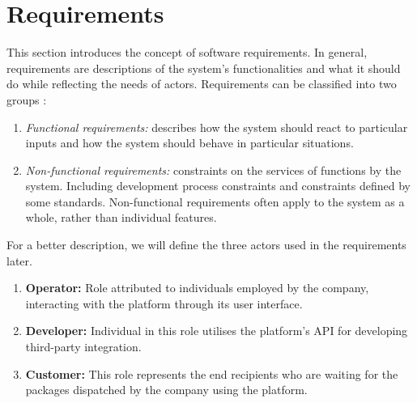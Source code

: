 \section{Requirements}
\label{sec:requirements}
This section introduces the concept of software requirements.
In general, requirements are descriptions of the system's functionalities and what it should do while reflecting the needs of actors.
Requirements can be classified into two groups \cite{sommervilleSW}:
\begin{enumerate}
    \item \textit{Functional requirements:} describes how the system should react to particular inputs and how the system should behave in particular situations.
    \item \textit{Non-functional requirements:} constraints on the services of functions by the system. Including development process constraints and constraints defined by some standards. Non-functional requirements often apply to the system as a whole, rather than individual features.
\end{enumerate}
For a better description, we will define the three actors used in the requirements later.
\label{sec:requirements-actors}
\begin{enumerate}
    \item \textbf{Operator:} Role attributed to individuals employed by the company, interacting with the platform through its user interface. 
    \item \textbf{Developer:} Individual in this role utilises the platform's API for developing third-party integration.
    \item \textbf{Customer:} This role represents the end recipients who are waiting for the packages dispatched by the company using the platform.
\end{enumerate}


